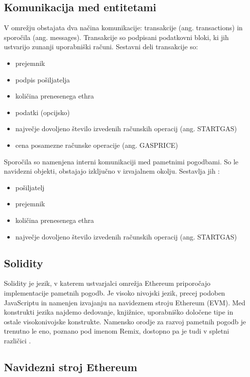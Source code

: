 \documentclass[a4paper, 12pt]{book}
\begin{document}
\subsection{Komunikacija med entitetami}
V omrežju obstajata dva načina komunikacije: transakcije (ang. transactions) in sporočila (ang. messages).
Transakcije so podpisani podatkovni bloki, ki jih ustvarijo zunanji uporabniški računi.
Sestavni deli transakcije so:
\begin{itemize}
	\item prejemnik
	\item podpis pošiljatelja
	\item količina prenesenega ethra
	\item podatki (opcijsko)
	\item največje dovoljeno število izvedenih računskih operacij (ang. STARTGAS)
	\item cena posamezne računske operacije (ang. GASPRICE)
\end{itemize}

Sporočila so namenjena interni komunikaciji med pametnimi pogodbami.
So le navidezni objekti, obstajajo izključno v izvajalnem okolju.
Sestavlja jih \cite{ethereumWhitepaper}:
\begin{itemize}
	\item pošiljatelj
	\item prejemnik
	\item količina prenesenega ethra
	\item največje dovoljeno število izvedenih računskih operacij (ang. STARTGAS)
\end{itemize}

\subsection{Solidity}
Solidity je jezik, v katerem ustvarjalci omrežja Ethereum priporočajo implementacije pametnih pogodb.
Je visoko nivojski jezik, precej podoben JavaScriptu in namenjen izvajanju na navideznem stroju Ethereum (EVM).
Med konstrukti jezika najdemo dedovanje, knjižnice, uporabniško določene tipe in ostale visokonivojske konstrukte.
Namensko orodje za razvoj pametnih pogodb je trenutno le eno, poznano pod imenom Remix, dostopno pa je tudi v spletni različici
\cite{solidityDocs}.

\subsection{Navidezni stroj Ethereum}
\end{document}
